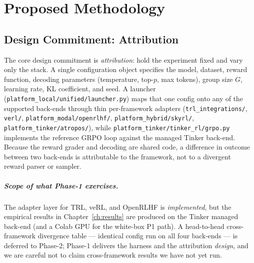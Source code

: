\chapter{Proposed Methodology}
\label{ch:method}

\section{Design Commitment: Attribution}
\label{sec:harness}

The core design commitment is \emph{attribution}: hold the experiment fixed and vary
only the stack. A single configuration object specifies the model, dataset, reward
function, decoding parameters (temperature, top-$p$, max tokens), group size $G$,
learning rate, KL coefficient, and seed. A launcher (\texttt{platform\_local/unified/launcher.py})
maps that one config onto any of the supported back-ends through thin per-framework
adapters (\texttt{trl\_integrations/}, \texttt{verl/}, \texttt{platform\_modal/openrlhf/},
\texttt{platform\_hybrid/skyrl/}, \texttt{platform\_tinker/atropos/}), while \texttt{platform\_tinker/tinker\_rl/grpo.py} implements the
reference GRPO loop against the managed Tinker back-end. Because the reward grader
and decoding are shared code, a difference in outcome between two back-ends is
attributable to the framework, not to a divergent reward parser or sampler.

\paragraph{Scope of what Phase-1 exercises.} The adapter layer for TRL, veRL, and
OpenRLHF is \emph{implemented}, but the empirical results in Chapter~\ref{ch:results}
are produced on the Tinker managed back-end (and a Colab GPU for the white-box P1
path). A head-to-head cross-framework divergence table --- identical config run on all
four back-ends --- is deferred to Phase-2; Phase-1 delivers the harness and the
attribution \emph{design}, and we are careful not to claim cross-framework results we
have not yet run.

